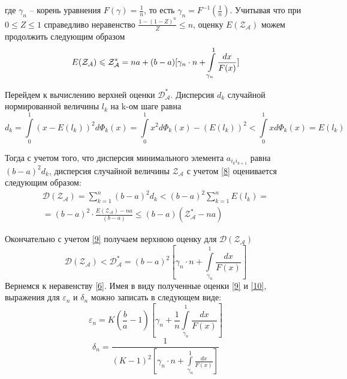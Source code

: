 \documentclass[a4paper, 14pt]{extarticle}
\numberwithin{equation}{section}
\begin{document}
где $\gamma_n$ -- корень уравнения $F(\gamma) = \frac{1}{n}$, то есть $\gamma_n = F^{-1}(\frac{1}{n})$. Учитывая что при $0 \leqslant Z \leqslant 1$ справедливо неравенство $\frac{1-(1-Z)^n}{Z} \leqslant n$, оценку $E( {\mathcal{Z_{A}}})$ можем продолжить следующим образом
\begin{equation}\label{9}
\text{$E(\text{$\mathcal{Z_{A}}$})$} \leqslant \text{$\mathcal{Z^*_{A}}$} = na+(b-a)[\gamma_n \cdot n+ \int\limits_{\gamma_n}^1 \frac{dx}{F(x)}]
\end{equation}

Перейдем к вычислению верхней оценки $\mathcal{D_A^{*}}$. Дисперсия $d_k$ случайной нормированной величины $l_k$ на k-ом шаге равна
\begin{equation}
d_k=\int\limits_0^1 (x-E(l_k))^2 d \Phi_k(x) = \int\limits_0^1 x^2 d \Phi_k(x)- (E(l_k))^2 < \int\limits_0^1 x d \Phi_k(x) = E(l_k)
\end{equation}

Тогда с учетом того, что дисперсия минимального элемента $a_{i_k i_{k+1}}$ равна $(b-a)^2 d_k$, дисперсия случайной величины ${\mathcal{Z_{A}}}$ с учетом \eqref{8} оценивается следующим образом:
\begin{equation}
\begin{aligned}
\mathcal{D(\mathcal{Z_{A}})} = \sum_{k=1}^n (b-a)^2 d_k < (b-a)^2 \sum_{k=1}^n E(l_k) =\\
= (b-a)^2 \cdot \frac{E(\mathcal{Z_{A}})-na}{(b-a)} \leqslant (b-a)(\mathcal{Z_{A}^*}-na)
\end{aligned}
\end{equation}

Окончательно с учетом \eqref{9} получаем верхнюю оценку для $\mathcal{D(\mathcal{Z_{A}})}$
\begin{equation}\label{10}
\mathcal{D(\mathcal{Z_{A}})} < \mathcal{D_{A}^*} = (b-a)^2 [\gamma_n\cdot n+\int\limits_{\gamma_n}^1 \frac{dx}{F(x)}]
\end{equation}
Вернемся к неравенству \eqref{6}. Имея в виду полученные оценки \eqref{9} и \eqref{10}, выражения для $\varepsilon_n$ и $\delta_n$ можно записать в следующем виде: 
\begin{equation}
\varepsilon_n = K(\frac{b}{a}-1)[\gamma_n + \frac{1}{n} \int\limits_{\gamma_n}^1 \frac{dx}{F(x)}]
\end{equation}
\begin{equation}
\delta_n = \frac{1}{(K-1)^2 [\gamma_n \cdot n + \int\limits_{\gamma_n}^1 \frac{dx}{F(x)}]}
\end{equation}
\end{document}
